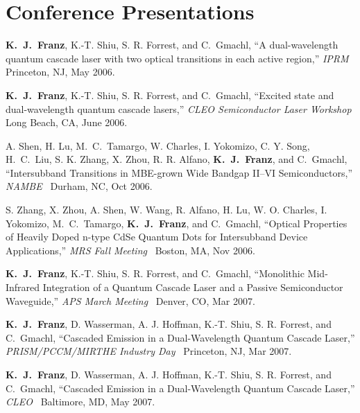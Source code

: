 %

\chapter*{Conference Presentations}
\renewcommand{\chaptermark}[1]{%
\markboth{\normalfont \textbf{\textsl{#1}}}{}}


\chaptermark{Conference Presentations}

\begin{list}{}{
  \setlength{\leftmargin}{0.25in}
  \setlength{\rightmargin}{0.25in}
  \setlength{\itemsep}{6pt}
}
\item \textbf{K.~J.~Franz}, K.-T. Shiu, S. R. Forrest, and C.~Gmachl, ``A dual-wavelength quantum cascade laser with two optical transitions in each active region,'' \emph{IPRM}  Princeton, NJ, May 2006. \enspace {}
\item \textbf{K.~J.~Franz}, K.-T. Shiu, S. R. Forrest, and C.~Gmachl, ``Excited state and dual-wavelength quantum cascade lasers,'' \emph{CLEO Semiconductor Laser Workshop}  Long Beach, CA, June 2006.
\item A. Shen, H. Lu, M.~C.~Tamargo, W. Charles, I. Yokomizo, C. Y. Song, H.~C.~Liu,  S. K. Zhang, X. Zhou, R. R. Alfano, \textbf{K.~J.~Franz}, and C.~Gmachl, ``Intersubband Transitions in MBE-grown Wide Bandgap II--VI Semiconductors,'' \emph{NAMBE}~ Durham, NC, Oct 2006.
\item S. Zhang, X. Zhou, A. Shen, W. Wang, R. Alfano, H. Lu, W. O. Charles, I. Yokomizo, M.~C.~Tamargo, \textbf{K.~J.~Franz}, and C.~Gmachl, ``Optical Properties of Heavily Doped n-type CdSe Quantum Dots for Intersubband Device Applications,'' \emph{MRS Fall Meeting}~ Boston, MA, Nov 2006.
\item \textbf{K.~J.~Franz}, K.-T. Shiu, S. R. Forrest, and C.~Gmachl, ``Monolithic Mid-Infrared  Integration of a Quantum Cascade Laser and a Passive Semiconductor Waveguide,'' \emph{APS March Meeting}~ Denver, CO, Mar 2007.
\item \textbf{K.~J.~Franz}, D. Wasserman, A. J. Hoffman, K.-T. Shiu, S. R. Forrest, and C.~Gmachl, ``Cascaded Emission in a Dual-Wavelength Quantum Cascade Laser,''  \emph{PRISM/PCCM/MIRTHE Industry Day}~ Princeton, NJ, Mar 2007.
\item \textbf{K.~J.~Franz}, D. Wasserman, A. J. Hoffman, K.-T. Shiu, S. R. Forrest, and C.~Gmachl, ``Cascaded Emission in a Dual-Wavelength Quantum Cascade Laser,'' \emph{CLEO}~  Baltimore, MD, May 2007.

\end{list}
